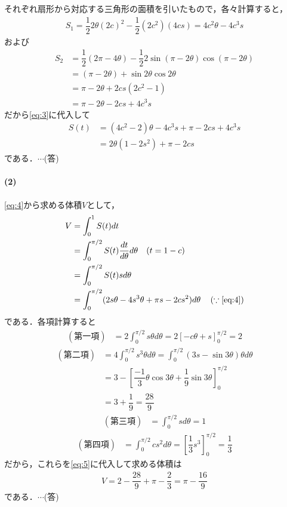 \documentclass[../../main.tex]{subfiles}
\begin{document}
それぞれ扇形から対応する三角形の面積を引いたもので，各々計算すると，
\begin{align}
  S_1
  =\dfrac{1}{2}2\theta(2c)^2 - \dfrac{1}{2}(2c^2)(4cs)
  =4c^2\theta-4c^3s
\end{align}
および
\begin{align}
  S_2
  &=\dfrac{1}{2}(2\pi-4\theta)-\dfrac{1}{2}2\sin(\pi-2\theta)\cos(\pi-2\theta) \\
  &=(\pi-2\theta)+\sin 2\theta\cos 2\theta \\
  &=\pi-2\theta+2cs(2c^2-1) \\
  &=\pi-2\theta-2cs+4c^3s
\end{align}
だから\cref{eq:3}に代入して
\begin{align}
  S(t)
  &=(4c^2-2)\theta-4c^3s+\pi-2cs+4c^3s \nonumber\\
  &=2\theta(1-2s^2)+\pi-2cs \label{eq:4}
\end{align}
である．$\cdots$(答)

\paragraph{(2)}

\cref{eq:4}から求める体積$V$として，
\begin{align}
  V&=\int_0^1S(t)dt \\
  &=\int_0^{\pi/2}S(t)\dfrac{dt}{d\theta}d\theta \quad (t=1-c)\\
  &=\int_0^{\pi/2}S(t)sd\theta \\
  &=\int_0^{\pi/2}(2s\theta-4s^3\theta+\pi s-2cs^2)d\theta \quad \left(\because\text{\cref{eq:4}}\right) \label{eq:5}
\end{align}
である．各項計算すると
\begin{align}
  (\text{第一項})
  &= 2\int_0^{\pi/2}s\theta d\theta=2\left[-c\theta+s\right]_0^{\pi/2}=2
\end{align}
\begin{align}
  (\text{第二項})
  &= 4\int_0^{\pi/2}s^3\theta d\theta=\int_0^{\pi/2}(3s-\sin3\theta)\theta d\theta \\
  &=3-\left[\dfrac{-1}{3}\theta\cos3\theta+\dfrac{1}{9}\sin3\theta\right]_0^{\pi/2} \\
  &=3+\dfrac{1}{9}=\dfrac{28}{9}
\end{align}
\begin{align}
  (\text{第三項})
  &= \int_0^{\pi/2}sd\theta=1
\end{align}
\begin{align}
  (\text{第四項})
  &=\int_0^{\pi/2}cs^2d\theta=\left[\dfrac{1}{3}s^3\right]_0^{\pi/2}=\dfrac{1}{3}
\end{align}
だから，これらを\cref{eq:5}に代入して求める体積は
\begin{align}
  V=2-\dfrac{28}{9}+\pi-\dfrac{2}{3}=\pi-\dfrac{16}{9}
\end{align}
である．$\cdots$(答)
\end{document}

